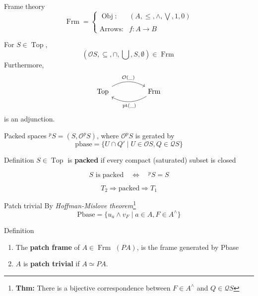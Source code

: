 \documentclass[compress,12pt]{beamer}
\DeclareMathOperator{\pt}{pt}
\DeclareMathOperator{\Frm}{Frm}
\DeclareMathOperator{\Top}{Top}
\DeclareMathOperator{\Obj}{Obj}
\begin{document}
\begin{frame}[fragile]{Frame theory}
\[
\Frm= \left\{ \begin{array}{lc} \Obj: & (A, \leq, \wedge, \bigvee, 1, 0) \\ \\ \mbox{Arrows:} & f\colon A\to B  \end{array} \right.
\]

For $S\in \Top$,
\[
(\mathcal{O}S, \subseteq, \cap, \bigcup, S, \emptyset)\in \Frm
\]
Furthermore,
\[
\begin{tikzcd}
\Top \arrow[rr, "\mathcal{O}(\_)", bend left] &  & \Frm \arrow[ll, "\pt(\_)", bend left]
\end{tikzcd}
\]
is an adjunction.
\end{frame}

\begin{frame}{Packed spaces}
    $^pS=(S, \mathcal{O}^pS)$, where $\mathcal{O}^pS$ is gerated by
    \[
    \mbox{pbase}=\{U\cap Q'\mid U\in \mathcal{O}S, Q\in \mathcal{Q}S\}
    \]
\begin{block}{Definition}
$S\in \Top$ is \textbf{packed} if every compact (saturated) subset is closed
\end{block}
\[
S \mbox{ is packed}\quad\iff\quad ^pS=S
\]

\[
T_2\Rightarrow \mbox{packed}\Rightarrow T_1
\]
\end{frame}

\begin{frame}{Patch trivial}
By \emph{Hoffman-Mislove theorem}\footnote{\textbf{Thm:} There is a bijective correspondence between $F\in A^\wedge$ and $Q\in \mathcal{Q}S$}
\[
\mbox{Pbase}=\{u_a\wedge v_F\mid a\in A, F\in A^\wedge\}
\]
\begin{block}{Definition}
\begin{enumerate}
    \item The \textbf{patch frame} of $A\in \Frm$ $(PA)$, is the frame generated by Pbase
    \item $A$ is \textbf{patch trivial} if $A\simeq PA$.
\end{enumerate}
\end{block}

\end{frame}
\end{document}
